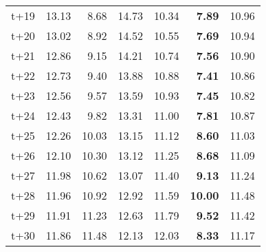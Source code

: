 \begin{table}[H]
\begin{tabular}{lrrrrrr}
t+19  & 13.13  & 8.68  & 14.73  & 10.34  & \textbf{7.89}  & 10.96  \\
t+20  & 13.02  & 8.92  & 14.52  & 10.55  & \textbf{7.69}  & 10.94  \\
t+21  & 12.86  & 9.15  & 14.21  & 10.74  & \textbf{7.56}  & 10.90  \\
t+22  & 12.73  & 9.40  & 13.88  & 10.88  & \textbf{7.41}  & 10.86  \\
t+23  & 12.56  & 9.57  & 13.59  & 10.93  & \textbf{7.45}  & 10.82  \\
t+24  & 12.43  & 9.82  & 13.31  & 11.00  & \textbf{7.81}  & 10.87  \\
t+25  & 12.26  & 10.03  & 13.15  & 11.12  & \textbf{8.60}  & 11.03  \\
t+26  & 12.10  & 10.30  & 13.12  & 11.25  & \textbf{8.68}  & 11.09  \\
t+27  & 11.98  & 10.62  & 13.07  & 11.40  & \textbf{9.13}  & 11.24  \\
t+28  & 11.96  & 10.92  & 12.92  & 11.59  & \textbf{10.00}  & 11.48  \\
t+29  & 11.91  & 11.23  & 12.63  & 11.79  & \textbf{9.52}  & 11.42  \\
t+30  & 11.86  & 11.48  & 12.13  & 12.03  & \textbf{8.33}  & 11.17  \\

\bottomrule
\end{tabular}
\end{table}
